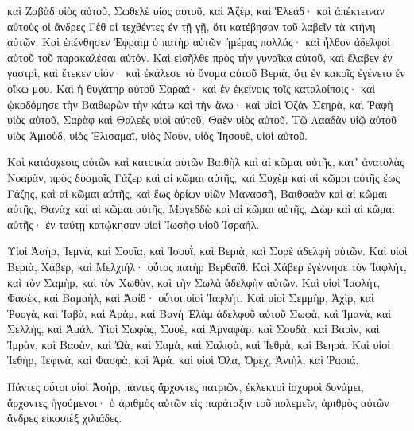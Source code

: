 {καὶ Ζαβὰδ υἱὸς αὐτοῦ, Σωθελὲ υἱὸς αὐτοῦ, καὶ Ἀζὲρ, καὶ Ἐλεάδ· καὶ ἀπέκτειναν αὐτοὺς οἱ ἄνδρες Γὲθ οἱ τεχθέντες ἐν τῇ γῇ, ὅτι κατέβησαν τοῦ λαβεῖν τὰ κτήνη αὐτῶν.
Καὶ ἐπένθησεν Ἐφραὶμ ὁ πατὴρ αὐτῶν ἡμέρας πολλάς· καὶ ἦλθον ἀδελφοὶ αὐτοῦ τοῦ παρακαλέσαι αὐτόν.
Καὶ εἰσῆλθε πρὸς τὴν γυναῖκα αὐτοῦ, καὶ ἔλαβεν ἐν γαστρὶ, καὶ ἔτεκεν υἱόν· καὶ ἐκάλεσε τὸ ὄνομα αὐτοῦ Βεριὰ, ὅτι ἐν κακοῖς ἐγένετο ἐν οἴκῳ μου.
Καὶ ἡ θυγάτηρ αὐτοῦ Σαραά· καὶ ἐν ἐκείνοις τοῖς καταλοίποις· καὶ ᾠκοδόμησε τὴν Βαιθωρὼν τὴν κάτω καὶ τὴν ἄνω· καὶ υἱοὶ Ὀζὰν Σεηρὰ,
καὶ Ῥαφὴ υἱὸς αὐτοῦ, Σαρὰφ καὶ Θαλεὲς υἱοὶ αὐτοῦ, Θαὲν υἱὸς αὐτοῦ.
Τῷ Λααδὰν υἱῷ αὐτοῦ υἱὸς Ἀμιοὺδ, υἱὸς Ἐλισαμαῒ,
υἱὸς Νοὺν, υἱὸς Ἰησουὲ, υἱοὶ αὐτοῦ.
\par }{\PP {}Καὶ κατάσχεσις αὐτῶν καὶ κατοικία αὐτῶν Βαιθὴλ καὶ αἱ κῶμαι αὐτῆς, κατʼ ἀνατολὰς Νοαρὰν, πρὸς δυσμαῖς Γάζερ καὶ αἱ κῶμαι αὐτῆς, καὶ Συχὲμ καὶ αἱ κῶμαι αὐτῆς ἕως Γάζης, καὶ αἱ κῶμαι αὐτῆς,
καὶ ἕως ὁρίων υἱῶν Μανασσῆ, Βαιθσαὰν καὶ αἱ κῶμαι αὐτῆς, Θανὰχ καὶ αἱ κῶμαι αὐτῆς, Μαγεδδὼ καὶ αἱ κῶμαι αὐτῆς, Δὼρ καὶ αἱ κῶμαι αὐτῆς· ἐν ταύτῃ κατῴκησαν υἱοὶ Ἰωσὴφ υἱοῦ Ἰσραήλ.
\par }{\PP {}Υἱοὶ Ἀσὴρ, Ἰεμνὰ, καὶ Σουΐα, καὶ Ἰσουῒ, καὶ Βεριὰ, καὶ Σορὲ ἀδελφὴ αὐτῶν.
Καὶ υἱοὶ Βεριὰ, Χάβερ, καὶ Μελχιήλ· οὗτος πατὴρ Βερθαΐθ.
Καὶ Χάβερ ἐγέννησε τὸν Ἰαφλὴτ, καὶ τὸν Σαμὴρ, καὶ τὸν Χωθὰν, καὶ τὴν Σωλὰ ἀδελφὴν αὐτῶν.
Καὶ υἱοὶ Ἰαφλὴτ, Φασὲκ, καὶ Βαμαὴλ, καὶ Ἀσίθ· οὗτοι υἱοὶ Ἰαφλήτ.
Καὶ υἱοὶ Σεμμὴρ, Ἀχὶρ, καὶ Ῥοογὰ, καὶ Ἰαβὰ, καὶ Ἀρὰμ,
καὶ Βανὴ Ἐλὰμ ἀδελφοῦ αὐτοῦ Σωφὰ, καὶ Ἰμανὰ, καὶ Σελλὴς, καὶ Ἀμάλ.
Υἱοὶ Σωφὰς, Σουὲ, καὶ Ἁρναφὰρ, καὶ Σουδὰ, καὶ Βαρὶν, καὶ Ἰμρὰν,
καὶ Βασὰν, καὶ Ὠὰ, καὶ Σαμὰ, καὶ Σαλισὰ, καὶ Ἰεθρὰ, καὶ Βεηρά.
Καὶ υἱοὶ Ἰεθὴρ, Ἰεφινὰ, καὶ Φασφὰ, καὶ Ἀρά.
καὶ υἱοὶ Ὀλὰ, Ὀρὲχ, Ἀνιὴλ, καὶ Ῥασιά.
\par }{\PP {}Πάντες οὗτοι υἱοὶ Ἀσὴρ, πάντες ἄρχοντες πατριῶν, ἐκλεκτοὶ ἰσχυροὶ δυνάμει, ἄρχοντες ἡγούμενοι· ὁ ἀριθμὸς αὐτῶν εἰς παράταξιν τοῦ πολεμεῖν, ἀριθμὸς αὐτῶν ἄνδρες εἰκοσιὲξ χιλιάδες.

}
